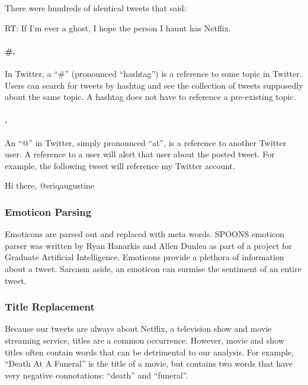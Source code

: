 \documentclass[12pt]{ucthesis}
\begin{document}
There were hundreds of identical tweets that said:

\begin{center}
   RT: If I'm ever a ghost, I hope the person I haunt has Netflix.
\end{center}

\paragraph{\#.}
\label{class-twitter-symbols-hash}
In Twitter, a ``\#'' (pronounced ``hashtag'') is a reference to some topic in Twitter.
Users can search for tweets by hashtag and see the collection of tweets supposedly about the
same topic. A hashtag does not have to reference a pre-existing topic.

\paragraph{\@.}
\label{class-twitter-symbols-at}
An ``@'' in Twitter, simply pronounced ``at'', is a reference to another Twitter user.
A reference to a user will alert that user about the posted tweet.
For example, the following tweet will reference my Twitter account.

\begin{center}
Hi there, @eriqaugustine
\end{center}

\subsubsection{Emoticon Parsing}
\label{class-filter-emoticon}
Emoticons are parsed out and replaced with meta words.
SPOONS emoticon parser was written by Ryan Hanarkis and Allen Dunlea as part of a project for Graduate Artificial Intelligence.
Emoticons provide a plethora of information about a tweet. Sarcasm aside,
an emoticon can surmise the sentiment of an entire tweet.

\subsubsection{Title Replacement}
\label{class-filter-title}
Because our tweets are always about Netflix, a television show and movie streaming service,
titles are a common occurrence. However, movie and show titles often contain words that can be
detrimental to our analysis. For example, ``Death At A Funeral'' is the title of a movie, but contains
two words that have very negative connotations: ``death'' and ``funeral''.
\end{document}
